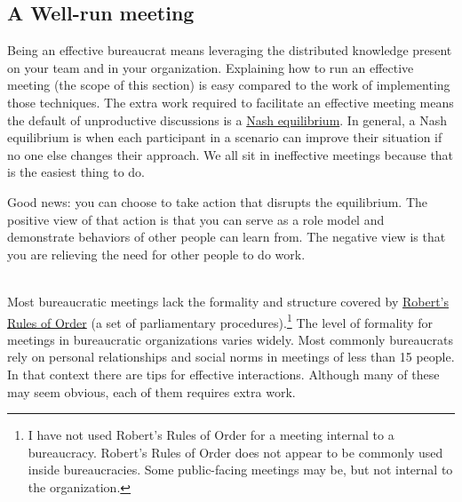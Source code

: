 \subsection*{A Well-run meeting\label{sec:well-run-meeting}}

Being an effective bureaucrat means leveraging the distributed knowledge present on your team and in your organization.
Explaining how to run an effective meeting (the scope of this section) is easy compared to the work of implementing those techniques. 
The extra work required to facilitate an effective meeting means the default of unproductive discussions is a \href{https://en.wikipedia.org/wiki/Nash_equilibrium}{Nash equilibrium}. 
\iftoggle{WPinmargin}{\marginpar{$>$Wikipedia: Nash equilibrium}}{}
In general, a Nash equilibrium is when each participant in a scenario can improve their situation if no one else changes their approach. 
We all sit in ineffective meetings because that is the easiest thing to do. 

Good news: you can choose to take action that disrupts the equilibrium. The positive view of that action is that you can serve as a role model and demonstrate behaviors of other people can learn from. The negative view is that you are relieving the need for other people to do work.

\ \\

Most bureaucratic meetings lack the formality and structure  covered by \href{https://en.wikipedia.org/wiki/Robert\%27s_Rules_of_Order}{Robert's Rules of Order} (a set of parliamentary procedures).\footnote{I have not used Robert's Rules of Order for a meeting internal to a bureaucracy. Robert's Rules of Order does not appear to be commonly used inside bureaucracies. Some public-facing meetings may be, but not internal to the organization.} 
\iftoggle{WPinmargin}{\marginpar{$>$Wikipedia: Robert's Rules of Order}}{}
The level of formality for meetings in bureaucratic organizations varies widely. Most commonly bureaucrats rely on personal relationships and social norms in meetings of less than 15 people. In that context there are tips for effective interactions. Although many of these may seem obvious, each of them requires extra work. 

